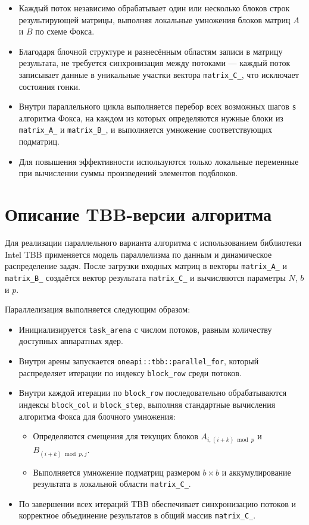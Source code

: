 \documentclass[14pt,a4paper]{extarticle}
\begin{document}
\begin{itemize}
    \item Каждый поток независимо обрабатывает один или несколько блоков строк результирующей матрицы, выполняя локальные умножения блоков матриц \( A \) и \( B \) по схеме Фокса.
    \item Благодаря блочной структуре и разнесённым областям записи в матрицу результата, не требуется синхронизация между потоками — каждый поток записывает данные в уникальные участки вектора \texttt{matrix\_C\_}, что исключает состояния гонки.
    \item Внутри параллельного цикла выполняется перебор всех возможных шагов \texttt{s} алгоритма Фокса, на каждом из которых определяются нужные блоки из \texttt{matrix\_A\_} и \texttt{matrix\_B\_}, и выполняется умножение соответствующих подматриц.
    \item Для повышения эффективности используются только локальные переменные при вычислении суммы произведений элементов подблоков.
\end{itemize}
\newpage

\section{Описание TBB-версии алгоритма}

Для реализации параллельного варианта алгоритма с использованием библиотеки Intel TBB применяется модель параллелизма по данным и динамическое распределение задач. После загрузки входных матриц в векторы \texttt{matrix\_A\_} и \texttt{matrix\_B\_} создаётся вектор результата \texttt{matrix\_C\_} и вычисляются параметры $N$, $b$ и $p$.

Параллелизация выполняется следующим образом:
\begin{itemize}
  \item Инициализируется \texttt{task\_arena} с числом потоков, равным количеству доступных аппаратных ядер.
  \item Внутри арены запускается \texttt{oneapi::tbb::parallel\_for}, который распределяет итерации по индексу \texttt{block\_row} среди потоков.
  \item Внутри каждой итерации по \texttt{block\_row} последовательно обрабатываются индексы \texttt{block\_col} и \texttt{block\_step}, выполняя стандартные вычисления алгоритма Фокса для блочного умножения:
    \begin{itemize}
      \item Определяются смещения для текущих блоков $A_{i,(i+k)\bmod p}$ и $B_{(i+k)\bmod p,j}$.
      \item Выполняется умножение подматриц размером $b\times b$ и аккумулирование результата в локальной области \texttt{matrix\_C\_}.
    \end{itemize}
  \item По завершении всех итераций TBB обеспечивает синхронизацию потоков и корректное объединение результатов в общий массив \texttt{matrix\_C\_}.
\end{itemize}
\end{document}
